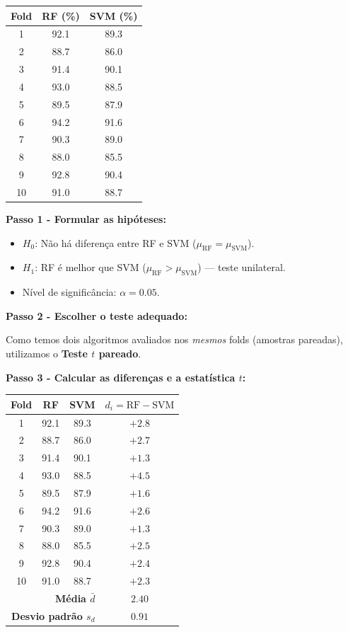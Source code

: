 \documentclass[12pt,a4paper]{article}
\begin{document}
\begin{center}
\begin{tabular}{ccc}
\toprule
Fold & RF (\%) & SVM (\%) \\
\midrule
1  & 92{.}1 & 89{.}3 \\
2  & 88{.}7 & 86{.}0 \\
3  & 91{.}4 & 90{.}1 \\
4  & 93{.}0 & 88{.}5 \\
5  & 89{.}5 & 87{.}9 \\
6  & 94{.}2 & 91{.}6 \\
7  & 90{.}3 & 89{.}0 \\
8  & 88{.}0 & 85{.}5 \\
9  & 92{.}8 & 90{.}4 \\
10 & 91{.}0 & 88{.}7 \\
\bottomrule
\end{tabular}
\end{center}

\textbf{Passo 1 - Formular as hipóteses:}
\begin{itemize}
  \item $H_0$: Não há diferença entre RF e SVM ($\mu_{\text{RF}} = \mu_{\text{SVM}}$).
  \item $H_1$: RF é melhor que SVM ($\mu_{\text{RF}} > \mu_{\text{SVM}}$) --- teste unilateral.
  \item Nível de significância: $\alpha = 0{.}05$.
\end{itemize}

\textbf{Passo 2 - Escolher o teste adequado:}

Como temos dois algoritmos avaliados nos \textit{mesmos} folds (amostras pareadas), utilizamos o \textbf{Teste $t$ pareado}.

\textbf{Passo 3 - Calcular as diferenças e a estatística $t$:}

\begin{center}
\begin{tabular}{cccc}
\toprule
Fold & RF & SVM & $d_i = \text{RF} - \text{SVM}$ \\
\midrule
1  & 92{.}1 & 89{.}3 & $+2{.}8$ \\
2  & 88{.}7 & 86{.}0 & $+2{.}7$ \\
3  & 91{.}4 & 90{.}1 & $+1{.}3$ \\
4  & 93{.}0 & 88{.}5 & $+4{.}5$ \\
5  & 89{.}5 & 87{.}9 & $+1{.}6$ \\
6  & 94{.}2 & 91{.}6 & $+2{.}6$ \\
7  & 90{.}3 & 89{.}0 & $+1{.}3$ \\
8  & 88{.}0 & 85{.}5 & $+2{.}5$ \\
9  & 92{.}8 & 90{.}4 & $+2{.}4$ \\
10 & 91{.}0 & 88{.}7 & $+2{.}3$ \\
\midrule
\multicolumn{3}{r}{\textbf{Média $\bar{d}$}} & $2{.}40$ \\
\multicolumn{3}{r}{\textbf{Desvio padrão $s_d$}} & $0{.}91$ \\
\bottomrule
\end{tabular}
\end{center}
\end{document}
